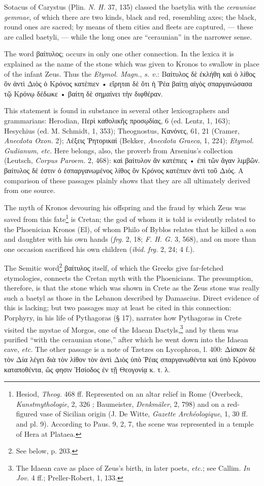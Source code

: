 \documentclass[a4paper, 12pt, oneside, polutonikogreek, english]{article}
\begin{document}
Sotacus of Carystus (Plin. \emph{N. H.} 37, 135) classed the baetylia with the \emph{cerauniae gemmae}, of which there are two kinds, black and red, resembling axes; the black, round ones are sacred; by means of them cities and fleets are captured, --- these are called baetyli, --- while the long ones are ``ceraunian'' in the narrower sense.

The word βαίτυλος; occurs in only one other connection. In the lexica it is explained as the name of the stone which was given to Kronos to swallow in place of the infant Zeus. Thus the \emph{Etymol. Magn.}, \emph{s. v.}: Βαίτυλος δὲ ἐκλήθη καὶ ὁ λίθος ὃν ἀντὶ Διὸς ὁ Κρόνος κατέπιεν • εἴρηται δὲ ὅτι ἡ Ῥέα βαίτῃ αἰγὸς σπαργανώσασα τῷ Κρόνῳ δέδωκε • βαίτη δὲ σημαίνει τὴν διφθέραν.

This statement is found in substance in several other lexicographers and grammarians: Herodian, Περὶ καθολικῆς προσῳδίας, 6 (ed. Lentz, 1, 163); Hesychius (ed. M. Schmidt, 1, 353); Theognostus, Κανόνες, 61, 21 (Cramer, \emph{Anecdota Oxon.} 2); Λέξεις Ῥητορικαί (Bekker, \emph{Anecdota Graeca}, 1, 224); \emph{Etymol. Gudianum}, \emph{etc.} Here belongs, also, the proverb from Arsenius's collection (Leutsch, \emph{Corpus Paroem.} 2, 468): καὶ βαίτυλον ἂν κατέπιες • ἐπὶ τῶν ἄγαν λιμβῶν. βαίτυλος δέ ἐστιν ὁ ἐσπαργανωμένος λίθος ὃν Kρόνος κατέπιεν ἀντὶ τοῦ Διός. A comparison of these passages plainly shows that they are all ultimately derived from one source.

The myth of Kronos devouring his offspring and the fraud by which Zeus was saved from this fate\footnote{Hesiod, \emph{Theog.} 468 ff. Represented on an altar relief in Rome (Overbeck, \emph{Kunstmythologie}, 2, 326 ; Baumeister, \emph{Denkmäler}, 2, 798) and on a red-figured vase of Sicilian origin (J. De Witte, \emph{Gazette Archéologique}, 1, 30 ff. and pl. 9). According to Paus. 9, 2, 7, the scene was represented in a temple of Hera at Plataea.} is Cretan; the god of whom it is told is evidently related to the Phoenician Kronos (El), of whom Philo of Byblos relates that he killed a son and daughter with his own hands (\emph{frg.} 2, 18; \emph{F. H. G.} 3, 568), and on more than one occasion sacrificed his own children (\emph{ibid.} \emph{frg.} 2, 24; 4 f.).

The Semitic word\footnote{See below, p. 203.} βαίτυλος itself, of which the Greeks give far-fetched etymologies, connects the Cretan myth with the Phoenicians. The presumption, therefore, is that the stone which was shown in Crete as the Zeus stone was really such a baetyl as those in the Lebanon described by Damascius. Direct evidence of this is lacking; but two passages may at least be cited in this connection: Porphyry, in his life of Pythagoras (§ 17), narrates how Pythagoras in Crete visited the mystae of Morgos, one of the Idaean Dactyls,\footnote{The Idaean cave as place of Zeus's birth, in later poets, \emph{etc.}; see Callim. \emph{In Jov.} 4 ff.; Preller-Robert, 1, 133.} and by them was purified ``with the ceraunian stone,'' after which he went down into the Idaean cave, \emph{etc.} The other passage is a note of Tzetzes on Lycophron, l. 400: Δίσκον δὲ τὸν Δία λέγει διὰ τὸν λίθον τὸν ἀντὶ Διὸς ὑπὸ Ῥέας σπαργανωθέντα καὶ ὑπὸ Κρόνου καταποθέντα, ὥς φησιν Ἡσίοδος ἐν τῇ Θεογονίᾳ κ. τ. λ.
\end{document}
